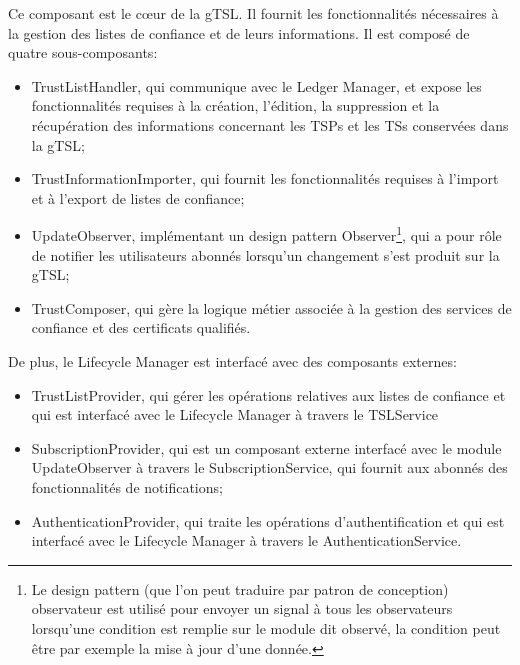 \documentclass{tnreport}
\begin{document}
Ce composant est le cœur de la gTSL. Il fournit les fonctionnalités nécessaires à la gestion des listes de confiance et de leurs informations. Il est composé de quatre sous-composants:
\begin{itemize}
	\item TrustListHandler, qui communique avec le Ledger Manager, et expose les fonctionnalités requises à la création, l'édition, la suppression et la récupération des informations concernant les TSPs et les TSs conservées dans la gTSL;
	\item TrustInformationImporter, qui fournit les fonctionnalités requises à l'import et à l'export de listes de confiance;
	\item UpdateObserver, implémentant un design pattern Observer\footnote{Le design pattern (que l'on peut traduire par patron de conception) observateur est utilisé pour envoyer un signal à tous les observateurs lorsqu'une condition est remplie sur le module dit observé, la condition peut être par exemple la mise à jour d'une donnée.}, qui a pour rôle de notifier les utilisateurs abonnés lorsqu'un changement s'est produit sur la gTSL;
	\item TrustComposer, qui gère la logique métier associée à la gestion des services de confiance et des certificats qualifiés.
\end{itemize}

De plus, le Lifecycle Manager est interfacé avec des composants externes:
\begin{itemize}
	\item TrustListProvider, qui gérer les opérations relatives aux listes de confiance et qui est interfacé avec le Lifecycle Manager à travers le TSLService
	\item SubscriptionProvider, qui est un composant externe interfacé avec le module UpdateObserver à travers le SubscriptionService, qui fournit aux abonnés des fonctionnalités de notifications;
	\item AuthenticationProvider, qui traite les opérations d'authentification et qui est interfacé avec le Lifecycle Manager à travers le AuthenticationService.
\end{itemize}

\end{document}
